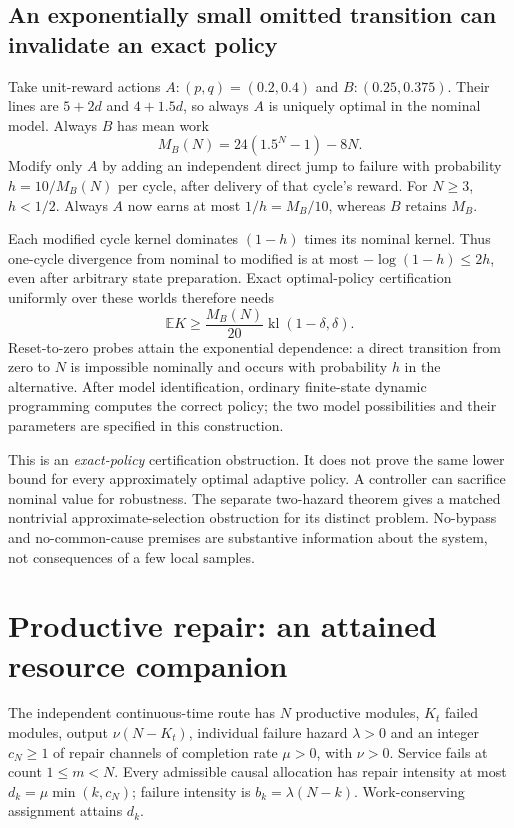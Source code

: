 \documentclass[10pt,a4paper]{article}
\newcommand{\E}{\mathbb E}\newcommand{\Pp}{\mathbb P}
\newcommand{\kl}{\operatorname{kl}}\newcommand{\KL}{\operatorname{KL}}
\begin{document}
\subsection{An exponentially small omitted transition can invalidate an exact policy}

Take unit-reward actions $A:(p,q)=(0.2,0.4)$ and $B:(0.25,0.375)$. Their lines are $5+2d$ and $4+1.5d$, so always $A$ is uniquely optimal in the nominal model. Always $B$ has mean work
\[
M_B(N)=24(1.5^N-1)-8N.
\]
Modify only $A$ by adding an independent direct jump to failure with probability $h=10/M_B(N)$ per cycle, after delivery of that cycle's reward. For $N\ge3$, $h<1/2$. Always $A$ now earns at most $1/h=M_B/10$, whereas $B$ retains $M_B$.

Each modified cycle kernel dominates $(1-h)$ times its nominal kernel. Thus one-cycle divergence from nominal to modified is at most $-\log(1-h)\le2h$, even after arbitrary state preparation. Exact optimal-policy certification uniformly over these worlds therefore needs
\begin{equation}
\E K\ge\frac{M_B(N)}{20}\kl(1-\delta,\delta).
\end{equation}
Reset-to-zero probes attain the exponential dependence: a direct transition from zero to $N$ is impossible nominally and occurs with probability $h$ in the alternative. After model identification, ordinary finite-state dynamic programming computes the correct policy; the two model possibilities and their parameters are specified in this construction.

This is an \emph{exact-policy} certification obstruction. It does not prove the same lower bound for every approximately optimal adaptive policy. A controller can sacrifice nominal value for robustness. The separate two-hazard theorem gives a matched nontrivial approximate-selection obstruction for its distinct problem. No-bypass and no-common-cause premises are substantive information about the system, not consequences of a few local samples.

\section{Productive repair: an attained resource companion}

The independent continuous-time route has $N$ productive modules, $K_t$ failed modules, output $\nu(N-K_t)$, individual failure hazard $\lambda>0$ and an integer $c_N\ge1$ of repair channels of completion rate $\mu>0$, with $\nu>0$. Service fails at count $1\le m<N$. Every admissible causal allocation has repair intensity at most
$d_k=\mu\min(k,c_N)$; failure intensity is $b_k=\lambda(N-k)$. Work-conserving assignment attains $d_k$.
\end{document}
